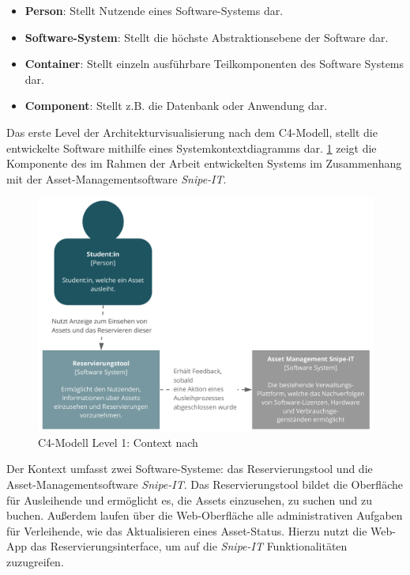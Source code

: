 \begin{itemize}
    \item \textbf{Person}: Stellt Nutzende eines Software-Systems dar.
    \item \textbf{Software-System}: Stellt die höchste Abstraktionsebene der
          Software dar.
    \item \textbf{Container}: Stellt einzeln ausführbare Teilkomponenten des
          Software Systems dar.
    \item \textbf{Component}: Stellt z.B. die Datenbank oder Anwendung dar.
\end{itemize}

{\sffamily\color{maincolor}{Level 1: Context}}

Das erste Level der Architekturvisualisierung nach dem C4-Modell, stellt die
entwickelte Software mithilfe eines Systemkontextdiagramms dar. \ref{fig:level1}
zeigt die Komponente des im Rahmen der Arbeit entwickelten Systems im
Zusammenhang mit der Asset-Managementsoftware \textit{Snipe-IT}.

\begin{figure}[h]
    \centering
    \includegraphics[scale=0.4]{Bilder/C4_1.pdf}
    \caption[C4-Modell Level 1: Context]{C4-Modell Level 1: Context nach
        }
    \label{fig:level1}
\end{figure}

Der Kontext umfasst zwei Software-Systeme: das Reservierungstool und die Asset-Managementsoftware
\textit{Snipe-IT}. Das Reservierungstool bildet die Oberfläche für Ausleihende und ermöglicht es, die Assets
einzusehen, zu suchen und zu buchen. Außerdem laufen über die Web-Oberfläche alle administrativen
Aufgaben für Verleihende, wie das Aktualisieren eines Asset-Status. Hierzu nutzt die Web-App das
Reservierungsinterface, um auf die \textit{Snipe-IT} Funktionalitäten zuzugreifen.

